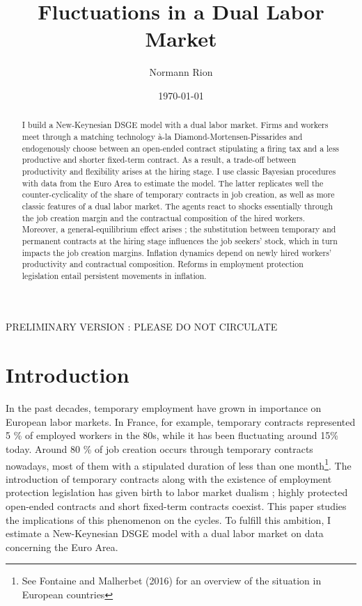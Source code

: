 \documentclass[a4paper]{article}
\title{Fluctuations in a Dual Labor Market}
\author{Normann Rion}
\date{\today}
\begin{document}
\maketitle

\begin{abstract}
I build a New-Keynesian DSGE model with a dual labor market. Firms and workers meet through a matching technology à-la Diamond-Mortensen-Pissarides and endogenously choose between an open-ended contract stipulating a firing tax and a less productive and shorter fixed-term contract. As a result, a trade-off between productivity and flexibility arises at the hiring stage. I use classic Bayesian procedures with data from the Euro Area to estimate the model. The latter replicates well the counter-cyclicality of the share of temporary contracts in job creation, as well as more classic features of a dual labor market. The agents react to shocks essentially through the job creation margin and the contractual composition of the hired workers. Moreover, a general-equilibrium effect arises ; the substitution between temporary and permanent contracts at the hiring stage influences the job seekers' stock, which in turn impacts the job creation margins. Inflation dynamics depend on newly hired workers' productivity and contractual composition. Reforms in employment protection legislation entail persistent movements in inflation.
\end{abstract}

\begin{center}
\textsc{PRELIMINARY VERSION : PLEASE DO NOT CIRCULATE}
\end{center}


\section{Introduction}

In the past decades, temporary employment have grown in importance on European labor markets. In France, for example, temporary contracts represented 5 \% of employed workers in the 80s, while it has been fluctuating around 15\% today. Around 80 \% of job creation occurs through temporary contracts nowadays, most of them with a stipulated duration of less than one month\footnote{See Fontaine and Malherbet (2016) \cite{fontaine2016cdd} for an overview of the situation in European countries}. The introduction of temporary contracts along with the existence of employment protection legislation has given birth to labor market dualism ; highly protected open-ended contracts and short fixed-term contracts coexist. This paper studies the implications of this phenomenon on the cycles. To fulfill this ambition, I estimate a New-Keynesian DSGE model with a dual labor market on data concerning the Euro Area.
\end{document}
